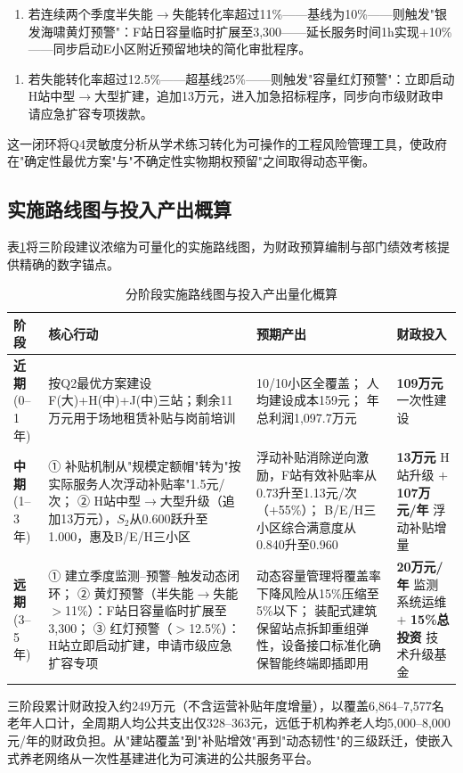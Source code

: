 \begin{enumerate}[label=\textbf{黄灯预警：}, leftmargin=*]
    \item 若连续两个季度半失能$\to$失能转化率超过11\%——基线为10\%——则触发"银发海啸黄灯预警"：F站日容量临时扩展至3,300——延长服务时间1h实现+10\%——同步启动E小区附近预留地块的简化审批程序。
\end{enumerate}
\begin{enumerate}[label=\textbf{红灯预警：}, leftmargin=*]
    \item 若失能转化率超过12.5\%——超基线25\%——则触发"容量红灯预警"：立即启动H站中型$\to$大型扩建，追加13万元，进入加急招标程序，同步向市级财政申请应急扩容专项拨款。
\end{enumerate}

这一闭环将Q4灵敏度分析从学术练习转化为可操作的工程风险管理工具，使政府在"确定性最优方案"与"不确定性实物期权预留"之间取得动态平衡。

\subsection{实施路线图与投入产出概算}

表\ref{tab:roadmap}将三阶段建议浓缩为可量化的实施路线图，为财政预算编制与部门绩效考核提供精确的数字锚点。

\begin{table}[H]
\centering
\footnotesize
\caption{分阶段实施路线图与投入产出量化概算}
\label{tab:roadmap}
\begin{tabular}{p{2.0cm}p{4.7cm}p{4.7cm}p{2.5cm}}
\toprule
\textbf{阶段} & \textbf{核心行动} & \textbf{预期产出} & \textbf{财政投入} \\
\midrule
\textbf{近期}
(0--1年) & 按Q2最优方案建设F(大)+H(中)+J(中)三站；剩余11万元用于场地租赁补贴与岗前培训 &
  10/10小区全覆盖；
  人均建设成本159元；
  年总利润1,097.7万元 &
  \textbf{109万元}
  一次性建设 \\
\midrule
\textbf{中期}
(1--3年) &
  ① 补贴机制从"规模定额帽"转为"按实际服务人次浮动补贴率"1.5元/次；
  ② H站中型$\to$大型升级（追加13万元），$S_2$从0.600跃升至1.000，惠及B/E/H三小区 &
  浮动补贴消除逆向激励，F站有效补贴率从0.73升至1.13元/次（+55\%）；
  B/E/H三小区综合满意度从0.840升至0.960 &
  \textbf{13万元}
  H站升级
  $+$
  \textbf{107万元/年}
  浮动补贴增量 \\
\midrule
\textbf{远期}
(3--5年) &
  ① 建立季度监测--预警--触发动态闭环；
  ② 黄灯预警（半失能$\to$失能$>$11\%）：F站日容量临时扩展至3,300；
  ③ 红灯预警（$>$12.5\%）：H站立即启动扩建，申请市级应急扩容专项 &
  动态容量管理将覆盖率下降风险从15\%压缩至5\%以下；
  装配式建筑保留站点拆卸重组弹性，设备接口标准化确保智能终端即插即用 &
  \textbf{20万元/年}
  监测系统运维
  $+$
  \textbf{15\%总投资}
  技术升级基金 \\
\bottomrule
\end{tabular}
\end{table}

三阶段累计财政投入约249万元（不含运营补贴年度增量），以覆盖6,864--7,577名老年人口计，全周期人均公共支出仅328--363元，远低于机构养老人均5,000--8,000元/年的财政负担。从"建站覆盖"到"补贴增效"再到"动态韧性"的三级跃迁，使嵌入式养老网络从一次性基建进化为可演进的公共服务平台。
